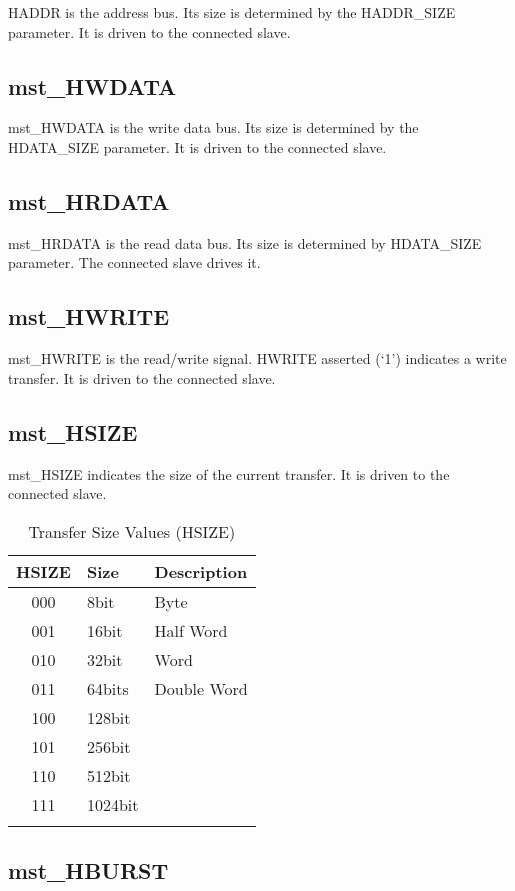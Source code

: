 HADDR is the address bus. Its size is determined by the HADDR\_SIZE
parameter. It is driven to the connected slave.

\subsection{mst\_HWDATA}\label{mst_hwdata}

mst\_HWDATA is the write data bus. Its size is determined by the
HDATA\_SIZE parameter. It is driven to the connected slave.

\subsection{mst\_HRDATA}\label{mst_hrdata}

mst\_HRDATA is the read data bus. Its size is determined by HDATA\_SIZE
parameter. The connected slave drives it.

\subsection{mst\_HWRITE}\label{mst_hwrite}

mst\_HWRITE is the read/write signal. HWRITE asserted (`1') indicates a
write transfer. It is driven to the connected slave.

\protect\hypertarget{_Toc326677772}{}{}

\subsection{mst\_HSIZE}\label{mst_hsize}

mst\_HSIZE indicates the size of the current transfer. It is driven to
the connected slave.

\begin{longtable}[]{@{}cll@{}}
\toprule
HSIZE & Size & Description\tabularnewline
\midrule
\endhead
000 & 8bit & Byte\tabularnewline
001 & 16bit & Half Word\tabularnewline
010 & 32bit & Word\tabularnewline
011 & 64bits & Double Word\tabularnewline
100 & 128bit &\tabularnewline
101 & 256bit &\tabularnewline
110 & 512bit &\tabularnewline
111 & 1024bit &\tabularnewline
\bottomrule
\caption{Transfer Size Values (HSIZE)}
\end{longtable}


\subsection{mst\_HBURST}\label{mst_hburst}

